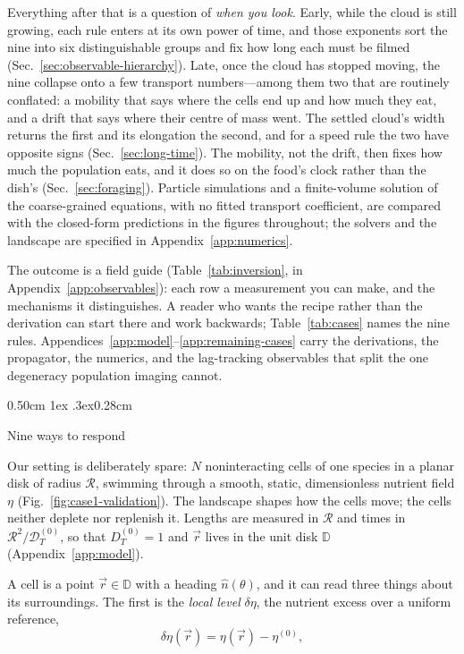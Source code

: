 \documentclass[
  reprint,
  superscriptaddress,
  amsmath,
  amssymb,
  aps,
  pre,
  nofootinbib,
  floatfix
]{revtex4-2}
\makeatletter
\newcommand{\rv}{\vec r}
\newcommand{\ev}{\hat{n}}
\newcommand{\Ud}{\mathbb D}
\def\section{\@startsection{section}{1}{\z@}%
  {0.50cm \@plus1ex \@minus.3ex}{0.28cm}%
  {\normalfont\small\bfseries\raggedright}}%
\makeatother
\begin{document}
Everything after that is a question of \emph{when you look}.  Early, while the
cloud is still growing, each rule enters at its own power of time, and those
exponents sort the nine into six distinguishable groups and fix how long each
must be filmed (Sec.~\ref{sec:observable-hierarchy}).  Late, once the cloud
has stopped moving, the nine collapse onto a few transport numbers---among
them two that are routinely conflated: a mobility that says where the cells
end up and how much they eat, and a drift that says where their centre of mass
went.  The settled cloud's width returns the first and its elongation the
second, and for a speed rule the two have opposite signs
(Sec.~\ref{sec:long-time}).  The mobility, not the drift, then fixes how much
the population eats, and it does so on the food's clock rather than the
dish's (Sec.~\ref{sec:foraging}).  Particle simulations and a finite-volume
solution of the coarse-grained equations, with no fitted transport
coefficient, are compared with the closed-form predictions in the figures
throughout; the solvers and the landscape are specified in
Appendix~\ref{app:numerics}.

The outcome is a field guide (Table~\ref{tab:inversion}, in
Appendix~\ref{app:observables}): each row a measurement you can make, and the
mechanisms it distinguishes.  A reader who wants the recipe rather than the
derivation can start there and work backwards; Table~\ref{tab:cases} names
the nine rules.  Appendices~\ref{app:model}--\ref{app:remaining-cases} carry
the derivations, the propagator, the numerics, and the lag-tracking
observables that split the one degeneracy population imaging cannot.

\section{Nine ways to respond}
\label{sec:overview}

Our setting is deliberately spare: $N$ noninteracting cells of one species in
a planar disk of radius $\mathcal R$, swimming through a smooth, static,
dimensionless nutrient field $\eta$ (Fig.~\ref{fig:case1-validation}).  The landscape shapes how the cells move;
the cells neither deplete nor replenish it.  Lengths are measured in
$\mathcal R$ and times in $\mathcal R^{2}/\mathcal D_T^{(0)}$, so that
$D_T^{(0)}=1$ and $\rv$ lives in the unit disk $\Ud$
(Appendix~\ref{app:model}).

A cell is a point $\rv\in\Ud$ with a heading $\ev(\theta)$, and it can read
three things about its surroundings.  The first is the \emph{local level}
$\delta\eta$, the nutrient excess over a uniform reference,
\begin{equation}
  \delta\eta(\rv)=\eta(\rv)-\eta^{(0)},
  \label{eq:deta}
\end{equation}
\end{document}
